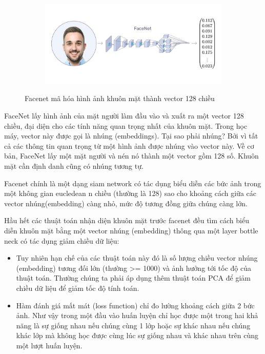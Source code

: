 \begin{figure}
    \begin{subfigure}{1.\textwidth}
        \begin{center}
            \includegraphics[width=1.\linewidth]{Chapters/items/chap2_17.jpg}
        \end{center}
        \label{fig: chap2_17}
    \end{subfigure}
    \caption{Facenet mã hóa hình ảnh khuôn mặt thành vector 128 chiều}
\end{figure}

FaceNet lấy hình ảnh của mặt người làm đầu vào và xuất ra một vector 128 chiều,
đại diện cho các tính năng quan trọng nhất của khuôn mặt.
Trong học máy, vector này được gọi là nhúng (embeddings).
Tại sao phải nhúng? Bởi vì tất cả các thông tin quan trọng từ một hình ảnh được nhúng
vào vector này. Về cơ bản, FaceNet lấy một mặt người và nén nó thành một vector gồm 128 số.
Khuôn mặt cần định danh cũng có nhúng tương tự.

Facenet chính là một dạng siam network có tác dụng biểu diễn các bức ảnh trong một không
gian eucledean n chiều (thường là 128) sao cho khoảng cách giữa các vector nhúng(embedding)
càng nhỏ, mức độ tương đồng giữa chúng càng lớn.

Hầu hết các thuật toán nhận diện khuôn mặt trước facenet đều tìm cách biểu diễn
khuôn mặt bằng một vector nhúng (embedding) thông qua một layer bottle neck có tác dụng
giảm chiều dữ liệu:

\begin{itemize}
    \item Tuy nhiên hạn chế của các thuật toán này đó là số lượng chiều vector nhúng (embedding)
          tương đối lớn (thường >= 1000) và ảnh hưởng tới tốc độ của thuật toán.
          Thường chúng ta phải áp dụng thêm thuật toán PCA để giảm chiều dữ liệu để giảm
          tốc độ tính toán.
    \item Hàm đánh giá mất mát (loss function) chỉ đo lường khoảng cách giữa 2 bức ảnh.
          Như vậy trong một đầu vào huấn luyện chỉ học được một trong hai khả năng
          là sự giống nhau nếu chúng cùng 1 lớp hoặc sự khác nhau nếu chúng khác
          lớp mà không học được cùng lúc sự giống nhau và khác nhau trên cùng một
          lượt huấn luyện.
\end{itemize}

